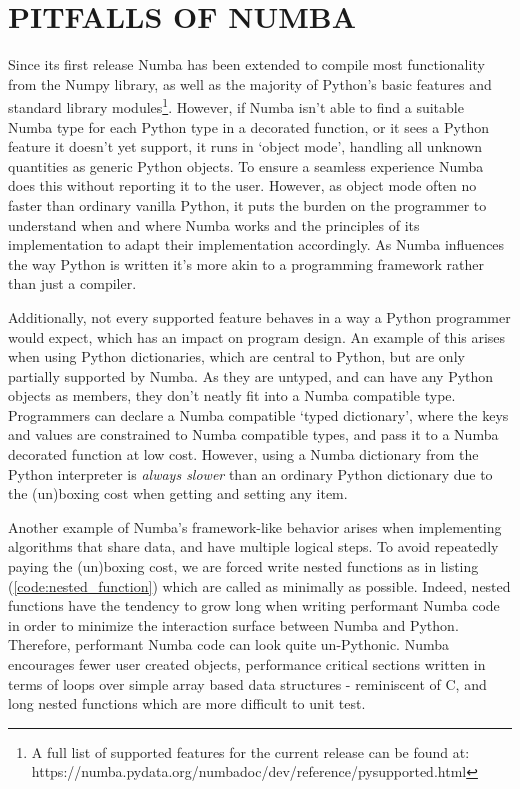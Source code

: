 \documentclass{IEEEcsmag}
\begin{document}


\section{PITFALLS OF NUMBA}\label{sec:pitfalls}

Since its first release Numba has been extended to compile most functionality from the Numpy library, as well as the majority of Python's basic features and standard library modules\footnote{A full list of supported features for the current release can be found at: https://numba.pydata.org/numba\-doc/dev/reference/pysupported.html}. However, if Numba isn't able to find a suitable Numba type for each Python type in a decorated function, or it sees a Python feature it doesn't yet support, it runs in `object mode', handling all unknown quantities as generic Python objects. To ensure a seamless experience Numba does this without reporting it to the user. However, as object mode often no faster than ordinary vanilla Python, it puts the burden on the programmer to understand when and where Numba works and the principles of its implementation to adapt their implementation accordingly. As Numba influences the way Python is written it's more akin to a programming framework rather than just a compiler.

Additionally, not every supported feature behaves in a way a Python programmer would expect, which has an impact on program design. An example of this arises when using Python dictionaries, which are central to Python, but are only partially supported by Numba. As they are untyped, and can have any Python objects as members, they don't neatly fit into a Numba compatible type. Programmers can declare a Numba compatible `typed dictionary', where the keys and values are constrained to Numba compatible types, and pass it to a Numba decorated function at low cost. However, using a Numba dictionary from the Python interpreter is \textit{always slower} than an ordinary Python dictionary due to the (un)boxing cost when getting and setting any item. 

Another example of Numba's framework-like behavior arises when implementing algorithms that share data, and have multiple logical steps. To avoid repeatedly paying the (un)boxing cost, we are forced write nested functions as in listing (\ref{code:nested_function}) which are called as minimally as possible. Indeed, nested functions have the tendency to grow long when writing performant Numba code in order to minimize the interaction surface between Numba and Python. Therefore, performant Numba code can look quite un-Pythonic. Numba encourages fewer user created objects, performance critical sections written in terms of loops over simple array based data structures - reminiscent of C, and long nested functions which are more difficult to unit test.
\end{document}
